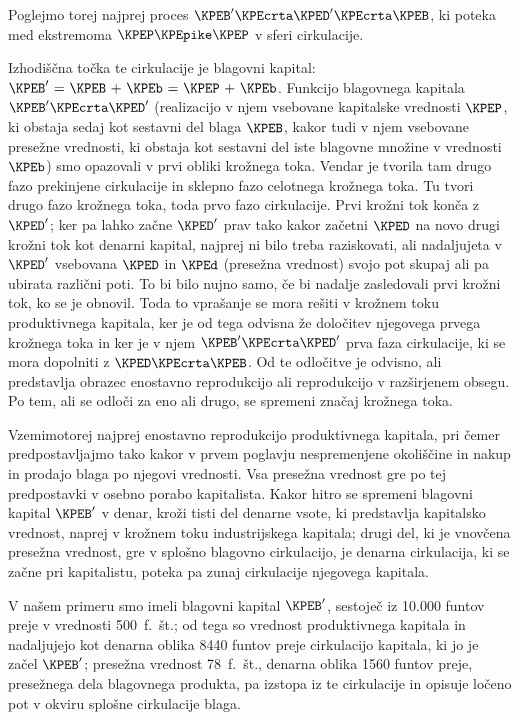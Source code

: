 \documentclass[kapital_02.tex]{subfiles}
\begin{document}
Poglejmo torej najprej proces \( \KPEB'\KPEcrta\KPED'\KPEcrta\KPEB \), ki poteka med ekstremoma \( \KPEP\KPEpike\KPEP \) v sferi cirkulacije.

Izhodiščna točka te cirkulacije je blagovni kapital: \( \KPEB' \textrm{ = } \KPEB \textrm{ + } \KPEb \textrm{ = } \KPEP \textrm{ + } \KPEb \). Funkcijo blagovnega kapitala \( \KPEB'\KPEcrta\KPED' \) (realizacijo v njem vsebovane kapitalske vrednosti \( \KPEP \), ki obstaja sedaj kot sestavni del blaga \( \KPEB \), kakor tudi v njem vsebovane presežne vrednosti, ki obstaja kot sestavni del iste blagovne množine v vrednosti \( \KPEb \)) smo opazovali v prvi obliki krožnega toka. Vendar je tvorila tam drugo fazo prekinjene cirkulacije in sklepno fazo celotnega krožnega toka. Tu tvori drugo fazo krožnega toka, toda prvo fazo cirkulacije. Prvi krožni tok konča z \( \KPED' \); ker pa lahko začne \( \KPED' \) prav tako kakor začetni \( \KPED \) na novo drugi krožni tok kot denarni kapital, najprej ni bilo treba raziskovati, ali nadaljujeta v \( \KPED' \) vsebovana \( \KPED \) in \( \KPEd \) (presežna vrednost) svojo pot skupaj ali pa ubirata različni poti. To bi bilo nujno samo, če bi nadalje zasledovali prvi krožni tok, ko se je obnovil. Toda to vprašanje se mora rešiti v krožnem toku produktivnega kapitala, ker je od tega odvisna že določitev njegovega prvega krožnega toka in ker je v njem \( \KPEB'\KPEcrta\KPED' \) prva faza cirkulacije, ki se mora dopolniti z \( \KPED\KPEcrta\KPEB \). Od te odločitve je odvisno, ali predstavlja obrazec enostavno reprodukcijo ali reprodukcijo v razširjenem obsegu. Po tem, ali se odloči za eno ali drugo, se spremeni značaj krožnega toka.

Vzemimo\KPEstran torej najprej enostavno reprodukcijo produktivnega kapitala, pri čemer predpostavljajmo tako kakor v prvem poglavju nespremenjene okoliščine in nakup in prodajo blaga po njegovi vrednosti. Vsa presežna vrednost gre po tej predpostavki v osebno porabo kapitalista. Kakor hitro se spremeni blagovni kapital \( \KPEB' \) v denar, kroži tisti del denarne vsote, ki predstavlja kapitalsko vrednost, naprej v krožnem toku industrijskega kapitala; drugi del, ki je vnovčena presežna vrednost, gre v splošno blagovno cirkulacijo, je denarna cirkulacija, ki se začne pri kapitalistu, poteka pa zunaj cirkulacije njegovega kapitala.

V našem primeru smo imeli blagovni kapital \( \KPEB' \), sestoječ iz 10.000 funtov preje v vrednosti 500\ f.\ št.; od tega so vrednost produktivnega kapitala in nadaljujejo kot denarna oblika 8440 funtov preje cirkulacijo kapitala, ki jo je začel \( \KPEB' \); presežna vrednost 78\ f.\ št., denarna oblika 1560 funtov preje, presežnega dela blagovnega produkta, pa izstopa iz te cirkulacije in opisuje ločeno pot v okviru splošne cirkulacije blaga.
\end{document}
